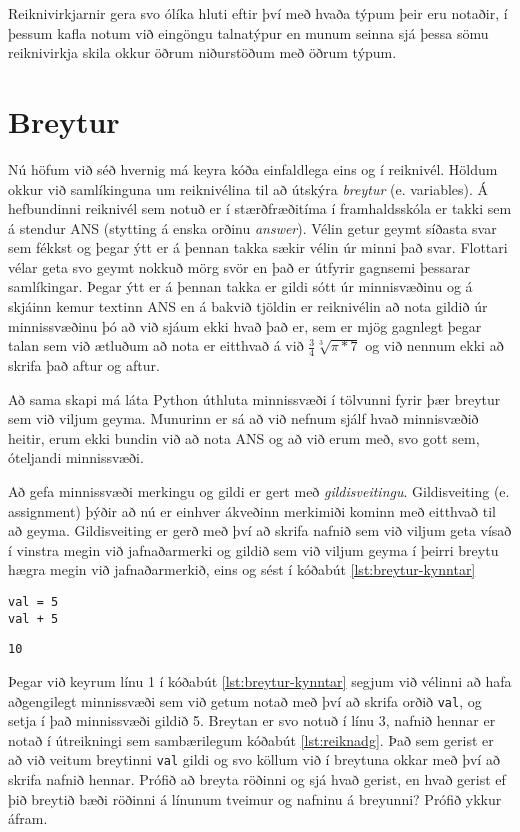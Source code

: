 Reiknivirkjarnir gera svo ólíka hluti eftir því með hvaða týpum þeir eru notaðir, í þessum kafla notum við eingöngu talnatýpur en munum seinna sjá þessa sömu reiknivirkja skila okkur öðrum niðurstöðum með öðrum týpum.

\section{Breytur}
Nú höfum við séð hvernig má keyra kóða einfaldlega eins og í reiknivél.
Höldum okkur við samlíkinguna um reiknivélina til að útskýra \emph{breytur} (e. variables).
Á hefbundinni reiknivél sem notuð er í stærðfræðitíma í framhaldsskóla er takki sem á stendur ANS (stytting á enska orðinu \textit{answer}).
Vélin getur geymt síðasta svar sem fékkst og þegar ýtt er á þennan takka sækir vélin úr minni það svar.
Flottari vélar geta svo geymt nokkuð mörg svör en það er útfyrir gagnsemi þessarar samlíkingar.
Þegar ýtt er á þennan takka er gildi sótt úr minnisvæðinu og á skjáinn kemur textinn ANS en á bakvið tjöldin er reiknivélin að nota gildið úr minnissvæðinu þó að við sjáum ekki hvað það er, sem er mjög gagnlegt þegar talan sem við ætluðum að nota er eitthvað á við $\frac{3}{4}\sqrt[3]{\pi*7} $ og við nennum ekki að skrifa það aftur og aftur.

Að sama skapi má láta Python úthluta minnissvæði í tölvunni fyrir þær breytur sem við viljum geyma.
Munurinn er sá að við nefnum sjálf hvað minnisvæðið heitir, erum ekki bundin við að nota ANS og að við erum með, svo gott sem, óteljandi minnissvæði.

Að gefa minnissvæði merkingu og gildi er gert með \textit{gildisveitingu}.
Gildisveiting (e. assignment) þýðir að nú er einhver ákveðinn merkimiði kominn með eitthvað til að geyma.
Gildisveiting er gerð með því að skrifa nafnið sem við viljum geta vísað í vinstra megin við jafnaðarmerki og gildið sem við viljum geyma í þeirri breytu hægra megin við jafnaðarmerkið, eins og sést í kóðabút \ref{lst:breytur-kynntar}

\begin{lstlisting}[caption=Breytur kynntar, label=lst:breytur-kynntar]
val = 5
val + 5
\end{lstlisting}
\lstset{style=uttak}
\begin{lstlisting}
10
\end{lstlisting}
\lstset{style=venjulegt}

Þegar við keyrum línu 1 í kóðabút \ref{lst:breytur-kynntar} segjum við vélinni að hafa aðgengilegt minnissvæði sem við getum notað með því að skrifa orðið \texttt{val}, og setja í það minnissvæði gildið 5.
Breytan er svo notuð í línu 3, nafnið hennar er notað í útreikningi sem sambærilegum kóðabút \ref{lst:reiknadg}.
Það sem gerist er að við veitum breytinni \texttt{val} gildi og svo köllum við í breytuna okkar með því að skrifa nafnið hennar.
Prófið að breyta röðinni og sjá hvað gerist, en hvað gerist ef þið breytið bæði röðinni á línunum tveimur og nafninu á breyunni?
Prófið ykkur áfram.

